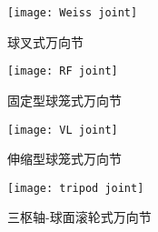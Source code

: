 \documentclass[UTF8]{ctexart}
\numberwithin{figure}{section}
\numberwithin{table}{section}
\begin{document}
\begin{figure}[htbp]
	\centering
	\begin{minipage}[b]{0.6\textwidth}
		\centering
		\texttt{[image: Weiss joint]}
		\caption{球叉式万向节}
		\label{Weiss joint}
	\end{minipage}
	\begin{minipage}[b]{0.5\textwidth}
		\centering
		\texttt{[image: RF joint]}
		\caption{固定型球笼式万向节}
		\label{RF joint}
	\end{minipage}
	\begin{minipage}[b]{0.4\textwidth}
		\centering
		\texttt{[image: VL joint]}
		\caption{伸缩型球笼式万向节}
		\label{VL joint}
	\end{minipage}
	\begin{minipage}[b]{0.5\textwidth}
		\centering
		\texttt{[image: tripod joint]}
		\caption{三枢轴-球面滚轮式万向节}
		\label{tripod joint}
	\end{minipage}
\end{figure}

\clearpage
\end{document}
